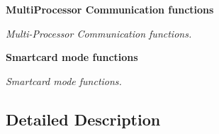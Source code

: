 \begin{DoxyCompactItemize}
\textbf{ Multi\+Processor Communication functions}
\begin{DoxyCompactList}\small\item\em Multi-\/\+Processor Communication functions. \end{DoxyCompactList}\item 
\textbf{ Smartcard mode functions}
\begin{DoxyCompactList}\small\item\em Smartcard mode functions. \end{DoxyCompactList}\end{DoxyCompactItemize}


\subsection{Detailed Description}
